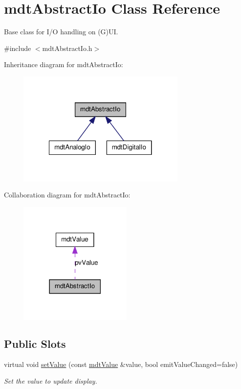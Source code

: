 \hypertarget{classmdt_abstract_io}{
\section{mdtAbstractIo Class Reference}
\label{classmdt_abstract_io}
}


Base class for I/O handling on (G)UI.  




{\ttfamily \#include $<$mdtAbstractIo.h$>$}



Inheritance diagram for mdtAbstractIo:\nopagebreak
\begin{figure}[H]
\begin{center}
\leavevmode
\includegraphics[width=236pt]{classmdt_abstract_io__inherit__graph}
\end{center}
\end{figure}


Collaboration diagram for mdtAbstractIo:
\nopagebreak
\begin{figure}[H]
\begin{center}
\leavevmode
\includegraphics[width=158pt]{classmdt_abstract_io__coll__graph}
\end{center}
\end{figure}
\subsection*{Public Slots}
\begin{DoxyCompactItemize}
\item 
virtual void \hyperlink{classmdt_abstract_io_a3f5fc9ed13c2ec2aad0987cd15d95e31}{setValue} (const \hyperlink{classmdt_value}{mdtValue} \&value, bool emitValueChanged=false)
\begin{DoxyCompactList}\small\item\em Set the value to update display. \end{DoxyCompactList}\end{DoxyCompactItemize}
